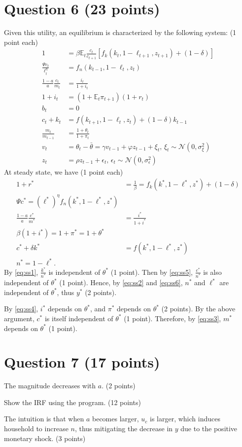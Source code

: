 \documentclass[12pt]{article}
\begin{document}
\section*{Question 6 (23 points)}
Given this utility, an equilibrium is characterized by the following system: (1 point each)
\begin{align*}
    1 &= \beta \mathbb{E}_t \frac{c_t}{c_{t+1}} \left[f_k(k_t, 1-\ell_{t+1}, z_{t+1}) + (1-\delta) \right]\\
    \frac{\Psi c_t}{\ell_t^\eta} &= f_n(k_{t-1}, 1-\ell_t, z_t)\\
    \frac{1-a}{a} \frac{c_t}{m_t} &= \frac{i_t}{1+i_t}\\
    1 + i_t &= \left(1 + \mathbb{E}_t \pi_{t+1}\right) (1+r_t)\\
    b_t &= 0\\
    c_t + k_t &= f(k_{t+1}, 1 - \ell_t, z_t) + (1-\delta)k_{t-1}\\
    \frac{m_t}{m_{t-1}} &= \frac{1+\theta_t}{1+\pi_t}\\
    v_t&= \theta_t - \bar{\theta} = \gamma v_{t-1} + \varphi z_{t-1} + \xi_t, \, \xi_t \sim \mathcal{N}(0, \sigma_\xi^2)\\
    z_t &= \rho z_{t-1} + \epsilon_t, \, \epsilon_t \sim \mathcal{N}(0, \sigma_\epsilon^2)
\end{align*}
At steady state, we have (1 point each)
\begin{align}
    1 + r^* &= \frac{1}{\beta} = f_k(k^*, 1-\ell^*, z^*) + (1-\delta) \label{eq:ss1} \\
    \Psi c^* = (\ell^*)^{\eta} f_n(k^*, 1-\ell^*, z^*) \label{eq:ss2}\\
    \frac{1-a}{a} \frac{c^*}{m^*} &= \frac{i^*}{1+i^*} \label{eq:ss3}\\
    \beta (1+i^*) = 1 + \pi^* = 1 + \theta^* \label{eq:ss4}\\
    c^* + \delta k^* &= f(k^*, 1-\ell^*, z^*) \label{eq:ss5}\\
    n^* = 1-\ell^*. \label{eq:ss6}
\end{align}
By \ref{eq:ss1}, $\frac{k^*}{n^*}$ is independent of $\theta^*$ (1 point). Then by \eqref{eq:ss5}, $\frac{c^*}{n^*}$ is also independent of $\theta^*$ (1 point). Hence, by \eqref{eq:ss2} and \eqref{eq:ss6}, $n^*$ and $\ell^*$ are independent of $\theta^*$, thus $y^*$ (2 points).

By \eqref{eq:ss4}, $i^*$ depends on $\theta^*$, and $\pi^*$ depends on $\theta^*$ (2 points). By the above argument, $c^*$ is itself independent of $\theta^*$ (1 point). Therefore, by \eqref{eq:ss3}, $m^*$ depends on $\theta^*$ (1 point).

\section*{Question 7 (17 points)}
The magnitude decreases with $a$. (2 points)

Show the IRF using the program. (12 points)

The intuition is that when $a$ becomes larger, $u_c$ is larger, which induces household to increase $n$, thus mitigating the decrease in $y$ due to the positive monetary shock. (3 points)
\end{document}
